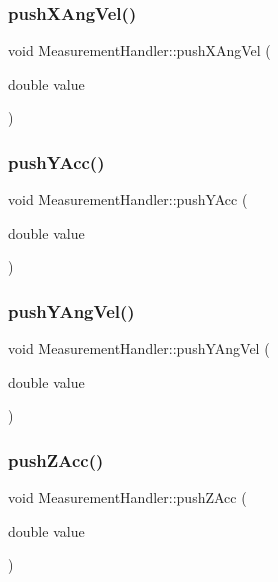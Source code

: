 \mbox{\label{class_measurement_handler_ad0cd4fa68261258a586ae193be1055ba}} 
\subsubsection{push\+X\+Ang\+Vel()}
{\footnotesize\ttfamily void Measurement\+Handler\+::push\+X\+Ang\+Vel (\begin{DoxyParamCaption}\item[{double}]{value }\end{DoxyParamCaption})}

\mbox{\label{class_measurement_handler_a43008204cdec1e632d2da7d76b6351af}} 
\subsubsection{push\+Y\+Acc()}
{\footnotesize\ttfamily void Measurement\+Handler\+::push\+Y\+Acc (\begin{DoxyParamCaption}\item[{double}]{value }\end{DoxyParamCaption})}

\mbox{\label{class_measurement_handler_a51a85f65ef2ca40ad069d66d3a770a57}} 
\subsubsection{push\+Y\+Ang\+Vel()}
{\footnotesize\ttfamily void Measurement\+Handler\+::push\+Y\+Ang\+Vel (\begin{DoxyParamCaption}\item[{double}]{value }\end{DoxyParamCaption})}

\mbox{\label{class_measurement_handler_a6fea470ec1ca66864bf7f416dc878639}} 
\subsubsection{push\+Z\+Acc()}
{\footnotesize\ttfamily void Measurement\+Handler\+::push\+Z\+Acc (\begin{DoxyParamCaption}\item[{double}]{value }\end{DoxyParamCaption})}

